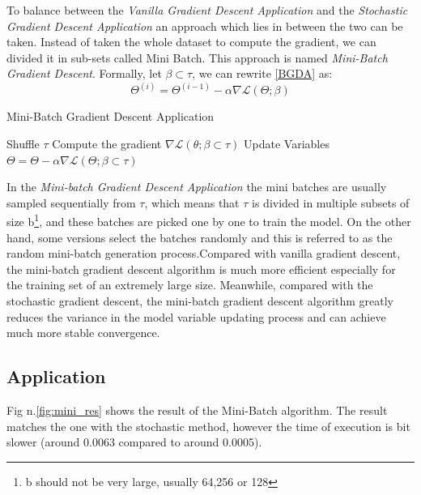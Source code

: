 \documentclass[conference]{IEEEtran}
\begin{document}
To balance between the \textit{Vanilla Gradient Descent Application} and the  \textit{Stochastic Gradient Descent Application} an approach which lies in between the two can be taken. Instead of taken the whole dataset to compute the gradient, we can divided it in sub-sets called Mini Batch. This approach is named \textit{Mini-Batch Gradient Descent}. 
Formally, let $\beta \subset \tau$, we can rewrite \eqref{BGDA} as:
\begin{equation}
    \Theta^{(i)} = \Theta^{(i-1)} - \alpha\nabla\mathscr{L}(\Theta;\beta )\label{eq:MBGDA}
\end{equation}

\begin{algorithm}
\caption{Mini-Batch Gradient Descent Application}\label{MBGDA}
\begin{algorithmic}[1]
\State Shuffle $\tau$
\State Compute the gradient $\nabla\mathscr{L}(\theta;\beta \subset \tau)$
\State Update Variables $\Theta = \Theta -\alpha\nabla\mathscr{L}(\Theta;\beta \subset \tau)$
\EndFor
\EndFor
{}
\end{algorithmic}
\end{algorithm}
In the \textit{Mini-batch Gradient Descent Application} the mini batches are usually sampled sequentially from $\tau$, which means that $\tau$ is divided in multiple subsets of size b\footnote{b should not be very large, usually 64,256 or 128}, and these batches are picked one by one to train the model. On the other hand, some versions select the batches randomly and this is referred to as the random mini-batch generation process.Compared with vanilla gradient descent, the mini-batch gradient descent algorithm is much more efficient especially for the training set of an extremely large size. Meanwhile, compared with the stochastic gradient descent, the mini-batch gradient descent algorithm greatly reduces the variance in the model variable updating process and can achieve much more stable convergence.\cite{JZ2019}
\subsection{Application}
Fig n.\ref{fig:mini_res} shows the result of the Mini-Batch algorithm. The result matches the one with the stochastic method, however the time of execution is bit slower (around 0.0063 compared to around 0.0005). 
\end{document}
